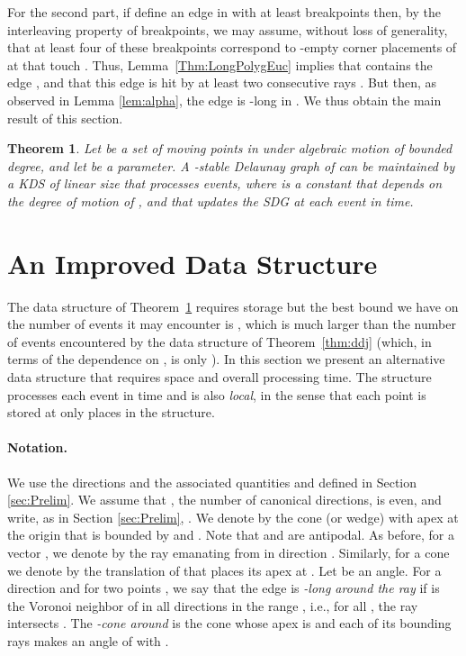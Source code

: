 \documentclass[letter,11pt]{article}
\newtheorem{theorem}{Theorem}[section]
\begin{document}
For the second part, if  define an edge  in  with at least  breakpoints then, by the interleaving property of breakpoints, we may assume, without loss of generality, that at least four of these breakpoints correspond to -empty corner placements of  at  that touch .
Thus, Lemma~\ref{Thm:LongPolygEuc} implies that  contains the edge , and that this edge is hit by at least two consecutive rays .
But then, as observed in Lemma \ref{lem:alpha}, the edge  is -long in .
We thus obtain the main result of this section.
 
\begin{theorem}\label{Thm:MaintainSDGPolyg}
Let  be a set of  moving points in  under algebraic
motion of bounded degree, 
and let  be a parameter.  A
-stable Delaunay graph of  can be maintained by a 
KDS of linear size that processes
  events, where  is a
constant that depends on the degree of motion of , and that 
updates the SDG  at each event in  time.
\end{theorem}


\section{An Improved Data Structure}
\label{Sec:ReduceS}

The data structure of Theorem~\ref{Thm:MaintainSDGPolyg} requires
 storage but the best bound we have on the number of
events it may encounter is , which is 
much larger than the number of events encountered by the data structure
of Theorem~\ref{thm:ddj} (which, in terms of the dependence on , is only ).  In this
section we present an alternative data structure that requires
 space and  overall processing
time.  The structure processes each event in  time and is also {\it local}, in the sense that each point is stored at only  places in the structure. 


\paragraph{Notation.}
We use the directions  and the associated quantities  and   defined in
Section \ref{sec:Prelim}. We assume that , the number of canonical directions, is even, and write, as in Section \ref{sec:Prelim}, .
We denote by  the cone (or wedge) with apex at the origin that is bounded by
 and . Note that  and  are antipodal.
As before, for a vector , we denote by  the ray emanating from  in direction . Similarly, for a cone  we denote
by  the translation of  that places its apex at .
Let  be an angle. For a direction 
and for two points , we say that the edge
 is \emph{-long around  the ray } 
if  is the Voronoi neighbor of  in all directions in the range 
, i.e., for all , the ray 
 intersects .
The  {\em -cone around  } is the cone whose apex is 
and each of its bounding rays makes an angle of  with .
\end{document}
